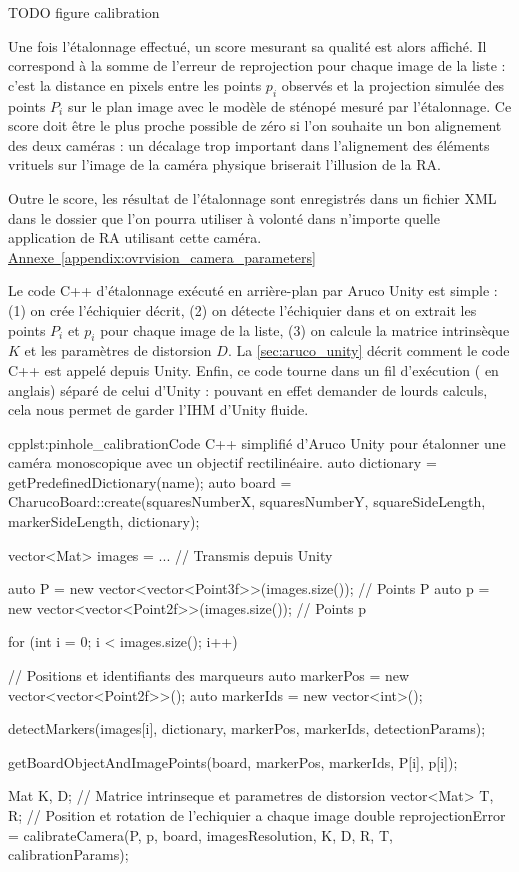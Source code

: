 TODO figure calibration

Une fois l'étalonnage effectué, un score mesurant sa qualité est alors affiché. Il correspond à la somme de l'erreur de reprojection pour chaque image de la liste : c'est la distance en pixels entre les points $p_i$ observés et la projection simulée des points $P_i$ sur le plan image avec le modèle de sténopé mesuré par l'étalonnage. Ce score doit être le plus proche possible de zéro si l'on souhaite un bon alignement des deux caméras : un décalage trop important dans l'alignement des éléments vrituels sur l'image de la caméra physique briserait l'illusion de la RA.

Outre le score, les résultat de l'étalonnage sont enregistrés dans un fichier XML dans le dossier  que l'on pourra utiliser à volonté dans n'importe quelle application de RA utilisant cette caméra. %
\hyperref[appendix:ovrvision_camera_parameters]{Annexe~\ref{appendix:ovrvision_camera_parameters}}

Le code C++ d'étalonnage exécuté en arrière-plan par Aruco Unity  est simple : (1) on crée l'échiquier décrit, (2) on détecte l'échiquier dans et on extrait les points $P_i$ et $p_i$ pour chaque image de la liste, (3) on calcule la matrice intrinsèque $K$ et les paramètres de distorsion $D$. La \autoref{sec:aruco_unity} décrit comment le code C++ est appelé depuis Unity. Enfin, ce code tourne dans un fil d'exécution ( en anglais) séparé de celui d'Unity : pouvant en effet demander de lourds calculs, cela nous permet de garder l'IHM d'Unity fluide.

\begin{listingETS}{cpp}{lst:pinhole_calibration}{Code C++ simplifié d'Aruco Unity pour étalonner une caméra monoscopique avec un objectif rectilinéaire.}
  auto dictionary = getPredefinedDictionary(name);
  auto board = CharucoBoard::create(squaresNumberX, squaresNumberY, squareSideLength, markerSideLength, dictionary);

  vector<Mat> images = ... // Transmis depuis Unity

  auto P = new vector<vector<Point3f>>(images.size()); // Points P
  auto p = new vector<vector<Point2f>>(images.size()); // Points p

  for (int i = 0; i < images.size(); i++) {
    // Positions et identifiants des marqueurs
    auto markerPos = new vector<vector<Point2f>>();
    auto markerIds = new vector<int>();

    detectMarkers(images[i], dictionary, markerPos, markerIds, detectionParams);

    getBoardObjectAndImagePoints(board, markerPos, markerIds, P[i], p[i]);
  }

  Mat K, D; // Matrice intrinseque et parametres de distorsion
  vector<Mat> T, R; // Position et rotation de l'echiquier a chaque image
  double reprojectionError = calibrateCamera(P, p, board, imagesResolution, K, D, R, T, calibrationParams);
\end{listingETS}


